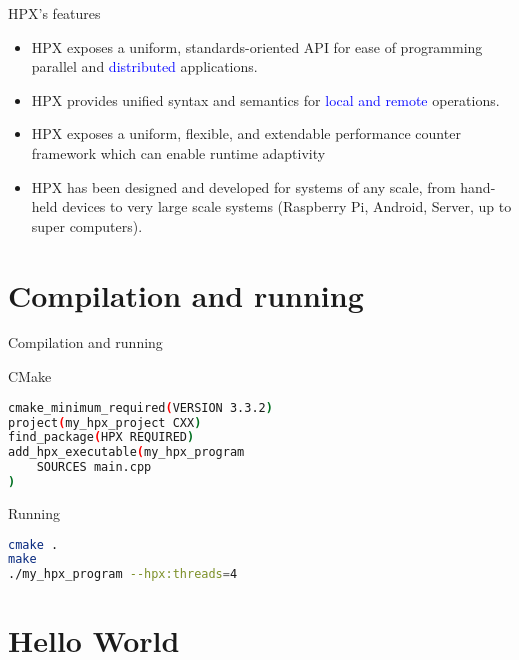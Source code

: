 \documentclass[\classoption]{beamer}
\begin{document}
\begin{frame}{HPX's features}
\begin{itemize}
\item HPX exposes a uniform, standards-oriented API for ease of programming parallel and \textcolor{blue}{distributed} applications.
\item HPX provides unified syntax and semantics for \textcolor{blue}{local and remote} operations.
\item HPX exposes a uniform, flexible, and extendable performance counter framework which can enable runtime adaptivity
\item HPX has been designed and developed for systems of any scale, from hand-held devices to very large scale systems (Raspberry Pi, Android, Server, up to super computers).
\end{itemize}
\end{frame}


\section{Compilation and running}

\begin{frame}[fragile]{Compilation and running}

\begin{block}{CMake}
\begin{lstlisting}[language=bash]
cmake_minimum_required(VERSION 3.3.2)
project(my_hpx_project CXX)
find_package(HPX REQUIRED)
add_hpx_executable(my_hpx_program
    SOURCES main.cpp
)
\end{lstlisting}
\end{block}

\begin{block}{Running}
\begin{lstlisting}[language=bash]
cmake .
make
./my_hpx_program --hpx:threads=4
\end{lstlisting}
\end{block}
\end{frame}


\section{Hello World}
\end{document}
